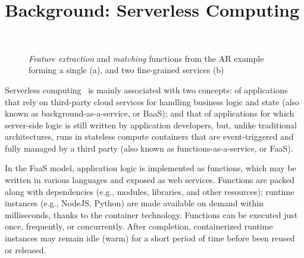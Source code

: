 \section{Background: Serverless Computing}\label{sec:background}


\begin{figure*}[tbp]
	\centering
	\captionsetup[subfigure]{width=0.47\linewidth}
	~
	\captionsetup[subfigure]{width=0.515\linewidth}
	\caption{\textit{Feature extraction} and \textit{matching} functions from the AR example forming a single (a), and two fine-grained services (b)} \label{fig:Mobile_Computation_Offloading}
\end{figure*}

Serverless computing~\cite{Lloyd18serverless,Roberts:2018} is mainly associated with two concepts: of applications that rely on third-party cloud services for handling business logic and state (also known as background-as-a-service, or BaaS); and that of applications for which server-side logic is still written by application developers, but, unlike traditional architectures, runs in stateless compute containers that are event-triggered
and fully managed by a third party (also known as functions-as-a-service, or FaaS).

In the FaaS model, application logic is implemented as functions, which may be written in various languages and exposed as web services. Functions are packed along with dependencies (e.g., modules, libraries, and other resources); runtime instances (e.g., NodeJS, Python) are made available on demand within milliseconds, thanks to the container technology. Functions can be executed just once, frequently, or concurrently. After completion, containerized runtime instances may remain idle (warm) for a short period of time before been reused or released.

